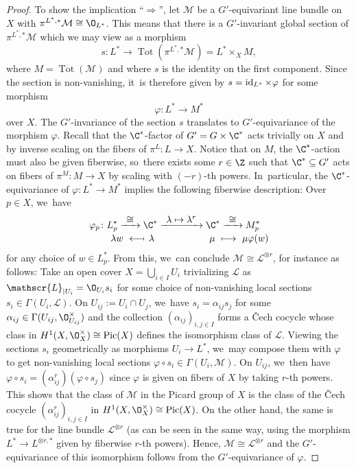 \documentclass[JEP,XML,SOM,Unicode,published]{cedram}
\newcommand\mto{\mathchoice{\longmapsto}{\mapsto}{\mapsto}{\mapsto}}
\newcommand{\To}[1]{\mathchoice{\xrightarrow{\textstyle\kern4pt#1\kern3pt}}{\xrightarrow{\,#1\,}}{}{}}
\newcommand\from{\mathchoice{\longleftarrow}{\leftarrow}{\leftarrow}{\leftarrow}}
\newcommand\mfrom{\mathrel{\from\joinrel\mapstochar}}
\newcommand{\Ell}{\mathscr{L}}
\DeclareMathOperator{\id}{\textup{id}}
\DeclareMathOperator{\Pic}{Pic}
\DeclareMathOperator{\Tot}{Tot}
\newcommand\restr[2]{{#1_{| {#2}}}}
\begin{document}
\begin{proof}
To show the implication ``$\Rightarrow$'', let $\mathcal M$ be a $G'$-equivariant line bundle on $X$ with $\pi^{L^*,*} \mathcal M \cong \O_{L^*}$. This means that there is a $G'$-invariant global section of $\pi^{L^*,*} \mathcal M$ which we may view as a morphism
\[
s \colon L^* \to \Tot(\pi^{L^*,*} \mathcal M) = L^* \times_X M,
\]
where $M = \Tot(\mathcal M)$ and where $s$ is the identity on the first component. Since the section is non-vanishing, it~is therefore given by $s = \id_{L^*} \times \varphi$ for some morphism
\[
\varphi \colon L^* \to M^*
\]
over $X$. The $G'$-invariance of the section $s$ translates to $G'$-equivariance of the morphism $\varphi$. Recall that the $\C^*$-factor of $G'=G \times \C^*$ acts trivially on $X$ and by inverse scaling on the fibers of $\pi^{L} \colon L \to X$. Notice that on $M$, the $\C^*$-action must also be given fiberwise, so~there exists some $r \in \Z$ such that $\C^* \subseteq G'$ acts on fibers of $\pi^{M}\colon M \to X$ by scaling with $(-r)$-th powers. In~particular, the $\C^*$-equivariance of $\varphi \colon L^* \to M^*$ implies the following fiberwise description: Over $p \in X$, we~have
\begin{align*}
\varphi_p \colon L_p^* \To{\cong} \C^* &\To{\lambda \mto \lambda^r} \C^* \To{\cong} M_p^* \\[
-0.25em]
\lambda w \ \mfrom \ \lambda \ &\hphantom{\To{\lambda \mto \lambda^r}{}} \ \ \mu \ \mto \ \mu \varphi(w)
\end{align*}
for any choice of $w \in L_p^*$.
From this, we~can conclude $\mathcal M \cong \Ell^{\otimes r}$, for instance as follows: Take an open cover $X = \bigcup_{i \in I} U_i$ trivializing $\Ell$ as $\restr{\Ell}{U_i} = \O_{U_i} s_i$ for some choice of non-vanishing local sections $s_i \in \Gamma(U_i,\Ell)$. On $U_{ij} := U_i \cap U_j$, we~have $s_i = \alpha_{ij} s_j$ for some $\alpha_{ij} \in \Gamma(U_{ij}, \O_{U_{ij}}^\times)$ and the collection $(\alpha_{ij})_{i,j \in I}$ forms a {\v{C}}ech cocycle whose class in $H^1(X,\O_X^\times) \cong \Pic(X)$ defines the isomorphism class of $\Ell$. Viewing the sections $s_i$ geometrically as morphisms $U_i \to L^*$, we~may compose them with $\varphi$ to get non-vanishing local sections $\varphi \circ s_i \in \Gamma(U_i, \mathcal M)$. On $U_{ij}$, we~then have $\varphi \circ s_i = (\alpha_{ij}^r) (\varphi \circ s_j)$ since $\varphi$ is given on fibers of $X$ by taking $r$-th powers. This shows that the class of $\mathcal M$ in the Picard group of $X$ is the class of the {\v{C}}ech cocycle $(\alpha_{ij}^r)_{i,j \in I}$ in $H^1(X,\O_X^\times) \cong \Pic(X)$. On the other hand, the same is true for the line bundle $\Ell^{\otimes r}$ (as can \eg be seen in the same way, using the morphism $L^* \to L^{\otimes r,*}$ given by fiberwise $r$-th powers). Hence, $\mathcal M \cong \Ell^{\otimes r}$ and the $G'$-equivariance of this isomorphism follows from the $G'$-equivariance of $\varphi$.
\end{proof}
\end{document}
